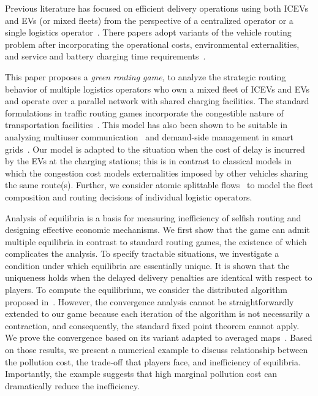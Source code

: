\documentclass[letterpaper, 10 pt, conference]{ieeeconf}  %
\begin{document}

Previous literature has focused on efficient delivery operations using both ICEVs and EVs (or mixed fleets) from the perspective of a centralized operator or a single logistics operator~\cite{Bektacs2011Pollution,Schneider2014Electric,Goeke2015Routing,Kocc2016Green,Shen2019Optimization}.
There papers adopt variants of the vehicle routing problem after incorporating the operational costs, environmental externalities, and service and battery charging time requirements~\cite{Asghari2021Green}.

This paper proposes a \emph{green routing game,} to analyze the strategic routing behavior of multiple logistics operators who own a mixed fleet of ICEVs and EVs and operate over a parallel network with shared charging facilities.
The standard formulations in traffic routing games incorporate the congestible nature of transportation facilities~\cite{Roughgarden2007Game,Krichene2014Stackelberg,Lazar2021Routing,Wu2021Value}.
This model has also been shown to be suitable in analyzing multiuser communication~\cite{Orda1993Competitive} and demand-side management in smart grids~\cite{Chen2014Autonomous,Jacquot2018Analysis}.
Our model is adapted to the situation when the cost of delay is incurred by the EVs at the charging stations;
this is in contrast to classical models in which the congestion cost models externalities imposed by other vehicles sharing the same route(s).
Further, we consider atomic splittable flows~\cite{Jacquot2018Routing} to model the fleet composition and routing decisions of individual logistic operators.

Analysis of equilibria is a basis for measuring inefficiency of selfish routing and designing effective economic mechanisms.
We first show that the game can admit multiple equilibria in contrast to standard routing games, the existence of which complicates the analysis.
To specify tractable situations, we investigate a condition under which equilibria are essentially unique.
It is shown that the uniqueness holds when the delayed delivery penalties are identical with respect to players.
To compute the equilibrium, we consider the distributed algorithm proposed in~\cite{Jacquot2018Analysis}.
However, the convergence analysis cannot be straightforwardly extended to our game because each iteration of the algorithm is not necessarily a contraction, and consequently, the standard fixed point theorem cannot apply.
We prove the convergence based on its variant adapted to averaged maps~\cite{Byrne2003Unified}.
Based on those results, we present a numerical example to discuss relationship between the pollution cost, the trade-off that players face, and inefficiency of equilibria.
Importantly, the example suggests that high marginal pollution cost can dramatically reduce the inefficiency.
\end{document}
